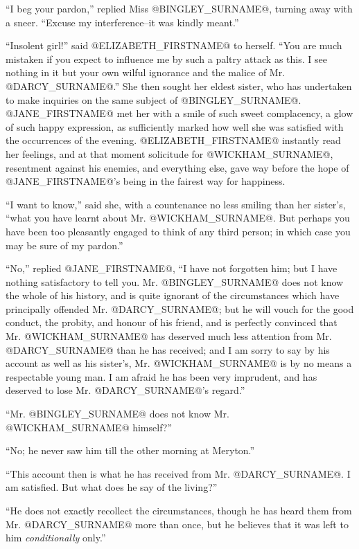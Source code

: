 ``I beg your pardon,'' replied Miss @BINGLEY_SURNAME@, turning away with a sneer.
``Excuse my interference--it was kindly meant.''

``Insolent girl!'' said @ELIZABETH_FIRSTNAME@ to herself. ``You are much mistaken
if you expect to influence me by such a paltry attack as this. I see
nothing in it but your own wilful ignorance and the malice of Mr.
@DARCY_SURNAME@.'' She then sought her eldest sister, who has undertaken to make
inquiries on the same subject of @BINGLEY_SURNAME@. @JANE_FIRSTNAME@ met her with a smile of
such sweet complacency, a glow of such happy expression, as sufficiently
marked how well she was satisfied with the occurrences of the evening.
@ELIZABETH_FIRSTNAME@ instantly read her feelings, and at that moment solicitude for
@WICKHAM_SURNAME@, resentment against his enemies, and everything else, gave way
before the hope of @JANE_FIRSTNAME@'s being in the fairest way for happiness.

``I want to know,'' said she, with a countenance no less smiling than her
sister's, ``what you have learnt about Mr. @WICKHAM_SURNAME@. But perhaps you have
been too pleasantly engaged to think of any third person; in which case
you may be sure of my pardon.''

``No,'' replied @JANE_FIRSTNAME@, ``I have not forgotten him; but I have nothing
satisfactory to tell you. Mr. @BINGLEY_SURNAME@ does not know the whole of
his history, and is quite ignorant of the circumstances which have
principally offended Mr. @DARCY_SURNAME@; but he will vouch for the good conduct,
the probity, and honour of his friend, and is perfectly convinced that
Mr. @WICKHAM_SURNAME@ has deserved much less attention from Mr. @DARCY_SURNAME@ than he has
received; and I am sorry to say by his account as well as his sister's,
Mr. @WICKHAM_SURNAME@ is by no means a respectable young man. I am afraid he has
been very imprudent, and has deserved to lose Mr. @DARCY_SURNAME@'s regard.''

``Mr. @BINGLEY_SURNAME@ does not know Mr. @WICKHAM_SURNAME@ himself?''

``No; he never saw him till the other morning at Meryton.''

``This account then is what he has received from Mr. @DARCY_SURNAME@. I am
satisfied. But what does he say of the living?''

``He does not exactly recollect the circumstances, though he has heard
them from Mr. @DARCY_SURNAME@ more than once, but he believes that it was left to
him \textit{conditionally} only.''

